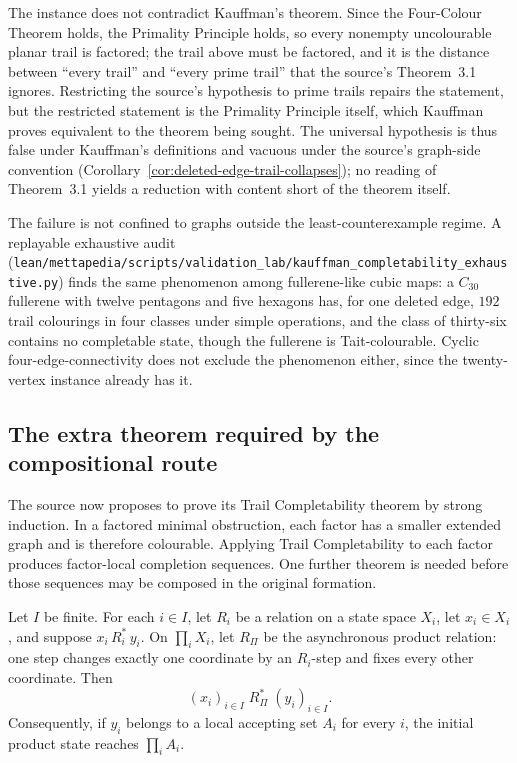 The instance does not contradict Kauffman's theorem.  Since the Four-Colour
Theorem holds, the Primality Principle holds, so every nonempty uncolourable
planar trail is factored; the trail above must be factored, and it is the
distance between ``every trail'' and ``every prime trail'' that the source's
Theorem~3.1 ignores.  Restricting the source's hypothesis to prime trails
repairs the statement, but the restricted statement is the Primality
Principle itself, which Kauffman proves equivalent to the theorem being
sought.  The universal hypothesis is thus false under Kauffman's definitions
and vacuous under the source's graph-side convention
(Corollary~\ref{cor:deleted-edge-trail-collapses}); no reading of
Theorem~3.1 yields a reduction with content short of the theorem itself.

The failure is not confined to graphs outside the least-counterexample
regime.  A replayable exhaustive audit
(\texttt{lean/mettapedia/scripts/validation\_lab/kauffman\_completability\_exhaustive.py})
finds the same phenomenon among fullerene-like cubic maps: a $C_{30}$
fullerene with twelve pentagons and five hexagons has, for one deleted edge,
$192$ trail colourings in four classes under simple operations, and the
class of thirty-six contains no completable state, though the fullerene is
Tait-colourable.  Cyclic four-edge-connectivity does not exclude the
phenomenon either, since the twenty-vertex instance already has it.

\subsection{The extra theorem required by the compositional route}

The source now proposes to prove its Trail Completability theorem by strong
induction.  In a factored minimal obstruction, each factor has a smaller
extended graph and is therefore colourable.  Applying Trail Completability
to each factor produces factor-local completion sequences.  One further
theorem is needed before those sequences may be composed in the original
formation.

\begin{lemma}
\label{lem:finite-product-reachability}
\Sprose
Let $I$ be finite.  For each $i\in I$, let $R_i$ be a relation on a state
space $X_i$, let $x_i\in X_i$, and suppose
$x_i\,R_i^{*}\,y_i$.  On $\prod_i X_i$, let $R_{\Pi}$ be the asynchronous
product relation: one step changes exactly one coordinate by an $R_i$-step
and fixes every other coordinate.  Then
\[
       (x_i)_{i\in I}\;R_{\Pi}^{*}\;(y_i)_{i\in I}.
\]
Consequently, if $y_i$ belongs to a local accepting set $A_i$ for every
$i$, the initial product state reaches $\prod_i A_i$.
\end{lemma}

